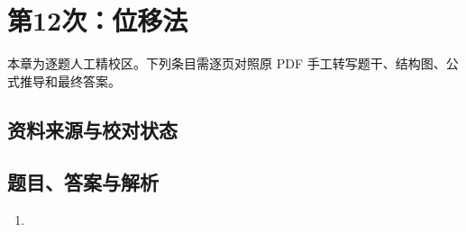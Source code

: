 \chapter{第12次：位移法}

本章为逐题人工精校区。下列条目需逐页对照原 PDF 手工转写题干、结构图、公式推导和最终答案。

\section{资料来源与校对状态}


\section{题目、答案与解析}

\begin{enumerate}[label=\textbf{第\arabic*题},wide]
  \item
  \begin{problemBox}
  \end{problemBox}

  \begin{solutionBox}
  \end{solutionBox}
\end{enumerate}
